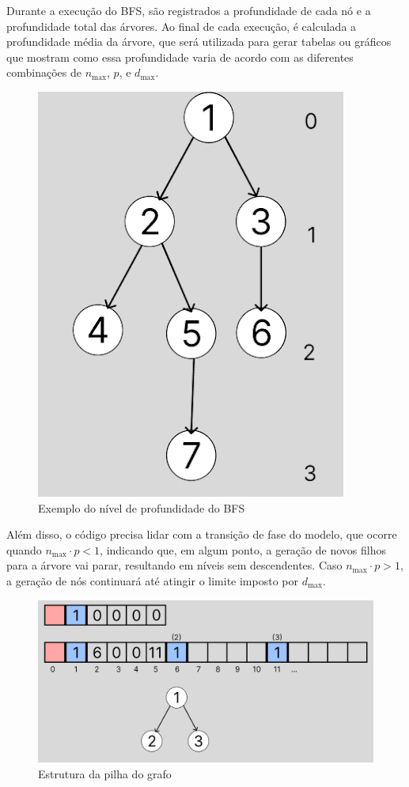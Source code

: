 \documentclass[12pt, a4paper]{scrreprt}
\begin{document}
\newpage

Durante a execução do BFS, são registrados a profundidade de cada nó e a profundidade total das árvores. Ao final de cada execução, é calculada a profundidade média da árvore, que será utilizada para gerar tabelas ou gráficos que mostram como essa profundidade varia de acordo com as diferentes combinações de \( n_{\text{max}} \), \( p \), e \( d_{\text{max}} \).

\vfill

\begin{figure}[h]
    \centering
    \includegraphics[width=.5\textwidth]{src/profundidade_BFS.png}
    \caption{Exemplo do nível de profundidade do BFS}
    \label{fig:profundidade BFS}
\end{figure}

\vfill

Além disso, o código precisa lidar com a transição de fase do modelo, que ocorre quando \( n_{\text{max}} \cdot p < 1\), indicando que, em algum ponto, a geração de novos filhos para a árvore vai parar, resultando em níveis sem descendentes. Caso \( n_{\text{max}} \cdot p > 1 \), a geração de nós continuará até atingir o limite imposto por \( d_{\text{max}} \).

\vfill
\begin{figure}[h]
    \centering
    \includegraphics[width=.7\textwidth]{src/estrutura_grafo_1.PNG}
    \caption{Estrutura da pilha do grafo}
    \label{fig:estrutura 1}
\end{figure}
\vfill
\end{document}
